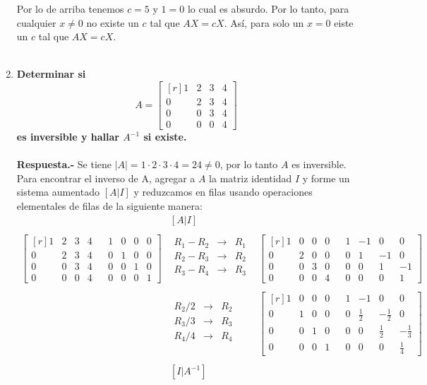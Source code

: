 \begin{enumerate}
	Por lo de arriba tenemos $c=5$ y $1=0$ lo cual es absurdo. Por lo tanto, para cualquier $x\neq 0$ no existe un $c$ tal que $AX=cX.$ Así, para solo un $x=0$ eiste un $c$ tal que $AX=cX.$\\\\


    \item \textbf{\boldmath Determinar si
	$$A=\begin{bmatrix*}[r]
	    1&2&3&4\\
	    0&2&3&4\\
	    0&0&3&4\\
	    0&0&0&4
	\end{bmatrix*}$$
	es inversible y hallar $A^{-1}$ si existe.\\\\
	Respuesta.-}\; Se tiene $|A|=1\cdot 2 \cdot 3 \cdot 4 = 24\neq 0$, por lo tanto $A$ es inversible. Para encontrar el inverso de A, agregar a $A$ la matriz identidad $I$ y forme un sistema aumentado $[A|I]$ y reduzcamos en filas usando operaciones elementales de filas de la siguiente manera:
	$$\begin{array}{rcl}
	    &[A|I]&\\\\
	    \begin{bmatrix*}[r]
		1&2&3&4&&1&0&0&0\\
		0&2&3&4&&0&1&0&0\\
		0&0&3&4&&0&0&1&0\\
		0&0&0&4&&0&0&0&1
	    \end{bmatrix*} 
	    &\begin{array}{rcl}
		R_1-R_2 &\to & R_1\\
		R_2-R_3 &\to & R_2\\
		R_3-R_4 &\to & R_3\\
	    \end{array}&
	    \begin{bmatrix*}[r]
		1&0&0&0&&1&-1&0&0\\
		0&2&0&0&&0&1&-1&0\\
		0&0&3&0&&0&0&1&-1\\
		0&0&0&4&&0&0&0&1
	    \end{bmatrix*}\\\\

	    &\begin{array}{rcl}
		R_2/2 &\to & R_2\\
		R_3/3 &\to & R_3\\
		R_4/4 &\to & R_4\\
	    \end{array}&
	    \begin{bmatrix*}[r]
		1&0&0&0&&1&-1&0&0\\
		0&1&0&0&&0&\frac{1}{2}&-\frac{1}{2}&0\\
		0&0&1&0&&0&0&\frac{1}{2}&-\frac{1}{3}\\
		0&0&0&1&&0&0&0&\frac{1}{4}
	    \end{bmatrix*}\\\\
	    &[I|A^{-1}]&
    \end{array}$$


\end{enumerate}
